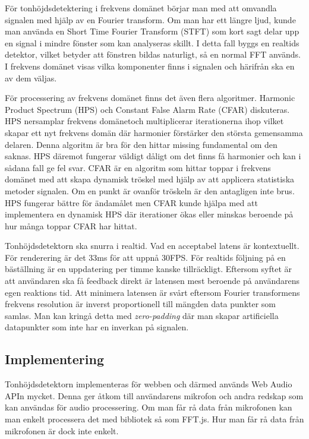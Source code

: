 För tonhöjdsdetektering i frekvens domänet börjar man med att omvandla signalen med hjälp av en Fourier transform. Om man har ett längre ljud, kunde man använda en Short Time Fourier Transform (STFT) som kort sagt delar upp en signal i mindre fönster som kan analyseras skillt. I detta fall byggs en realtids detektor, vilket betyder att fönstren bildas naturligt, så en normal FFT används. I frekvens domänet visas vilka komponenter finns i signalen och härifrån ska en av dem väljas.

För processering av frekvens domänet finns det även flera algoritmer. Harmonic Product Spectrum (HPS) och Constant False Alarm Rate (CFAR) diskuteras. HPS nersamplar frekvens domänetoch multiplicerar iterationerna ihop vilket skapar ett nyt frekvens domän där harmonier förstärker den största gemensamma delaren. Denna algoritm är bra för den hittar missing fundamental om den saknas. HPS däremot fungerar väldigt dåligt om det finns få harmonier och kan i sådana fall ge fel svar. CFAR är en algoritm som hittar toppar i frekvens domänet med att skapa dynamisk tröskel med hjälp av att applicera statistiska metoder signalen. Om en punkt är ovanför tröskeln är den antagligen inte brus. HPS fungerar bättre för ändamålet men CFAR kunde hjälpa med att implementera en dynamisk HPS där iterationer ökas eller minskas beroende på hur många toppar CFAR har hittat. 

Tonhöjdsdetektorn ska snurra i realtid. Vad en acceptabel latens är kontextuellt. För renderering är det 33ms för att uppnå 30FPS. För realtids följning på en bäställning är en uppdatering per timme kanske tillräckligt. Eftersom syftet är att användaren ska få feedback direkt är latensen mest beroende på användarens egen reaktions tid. Att minimera latensen är svårt eftersom Fourier transformens frekvens resolution är inverst proportionell till mängden data punkter som samlas. Man kan kringå detta med \textit{zero-padding} där man skapar artificiella datapunkter som inte har en inverkan på signalen. 
\subsection*{Implementering}
Tonhöjdsdetektorn implementeras för webben och därmed används Web Audio APIn mycket. Denna ger åtkom till användarens mikrofon och andra redskap som kan användas för audio processering. Om man får rå data från mikrofonen kan man enkelt processera det med bibliotek så som FFT.js. Hur man får rå data från mikrofonen är dock inte enkelt. 

